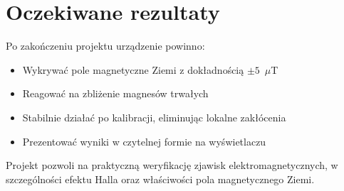 \documentclass[12pt,a4paper]{article}
\begin{document}
\section{Oczekiwane rezultaty}

Po zakończeniu projektu urządzenie powinno:
\begin{itemize}
    \item Wykrywać pole magnetyczne Ziemi z dokładnością $\pm 5$~$\mu$T
    \item Reagować na zbliżenie magnesów trwałych
    \item Stabilnie działać po kalibracji, eliminując lokalne zakłócenia
    \item Prezentować wyniki w czytelnej formie na wyświetlaczu
\end{itemize}

Projekt pozwoli na praktyczną weryfikację zjawisk elektromagnetycznych, w szczególności efektu Halla oraz właściwości pola magnetycznego Ziemi.
\end{document}
